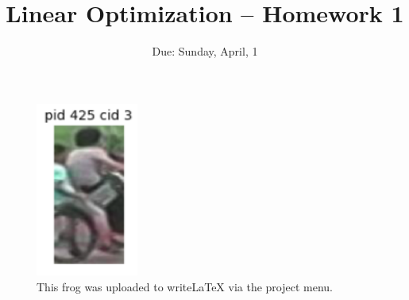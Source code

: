\documentclass[a4paper]{article}
\title{Linear Optimization -- Homework 1}
\author{Due: Sunday, April, 1}
\date{}
\begin{document}
\maketitle




\begin{figure}
	\centering
	\includegraphics[width=0.3\textwidth]{frog.png}
	\caption{\label{fig:frog}This frog was uploaded to writeLaTeX via the project menu.}
\end{figure}
\end{document}
